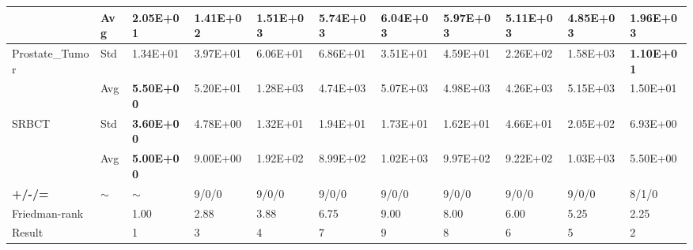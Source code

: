 \documentclass{article} %
\begin{document}
\begin{tabular}{|p{0.4in}|p{0.4in}|p{0.4in}|p{0.4in}|p{0.4in}|p{0.4in}|p{0.4in}|p{0.4in}|p{0.4in}|p{0.4in}|p{0.4in}|}
 & Avg & \textbf{2.05E+01} & 1.41E+02 & 1.51E+03 & 5.74E+03 & 6.04E+03 & 5.97E+03 & 5.11E+03 & 4.85E+03 & 1.96E+03 \\ \hline 
Prostate\_Tumor & Std & 1.34E+01 & 3.97E+01 & 6.06E+01 & 6.86E+01 & 3.51E+01 & 4.59E+01 & 2.26E+02 & 1.58E+03 & \textbf{1.10E+01} \\ \hline 
 & Avg & \textbf{5.50E+00} & 5.20E+01 & 1.28E+03 & 4.74E+03 & 5.07E+03 & 4.98E+03 & 4.26E+03 & 5.15E+03 & 1.50E+01 \\ \hline 
SRBCT & Std & \textbf{3.60E+00} & 4.78E+00 & 1.32E+01 & 1.94E+01 & 1.73E+01 & 1.62E+01 & 4.66E+01 & 2.05E+02 & 6.93E+00 \\ \hline 
\textbf{} & Avg & \textbf{5.00E+00} & 9.00E+00 & 1.92E+02 & 8.99E+02 & 1.02E+03 & 9.97E+02 & 9.22E+02 & 1.03E+03 & 5.50E+00 \\ \hline 
\textbf{+/-/=} & $\mathrm{\sim}$ & $\mathrm{\sim}$ & 9/0/0 & 9/0/0 & 9/0/0 & 9/0/0 & 9/0/0 & 9/0/0 & 9/0/0 & 8/1/0 \\ \hline 
Friedman-rank &  & 1.00  & 2.88  & 3.88  & 6.75  & 9.00  & 8.00  & 6.00  & 5.25  & 2.25  \\ \hline 
Result &  & 1 & 3 & 4 & 7 & 9 & 8 & 6 & 5 & 2 \\ \hline 
\end{tabular}
\end{document}
